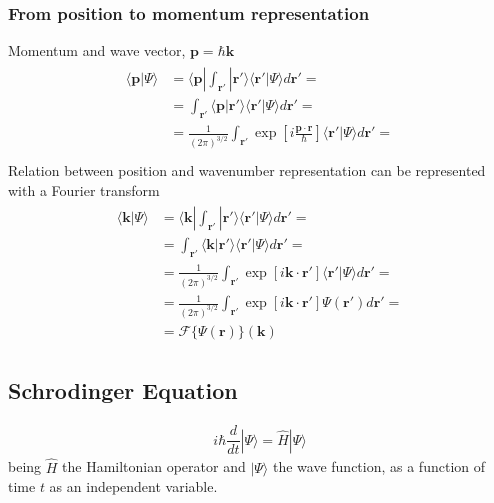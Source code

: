 \documentclass[letterpaper,10pt,english]{jupyterBook}
\begin{document}
\subsubsection{From position to momentum representation}
\label{\detokenize{ch/quantum-mechanics/intro:from-position-to-momentum-representation}}
\sphinxAtStartPar
Momentum and wave vector, \(\mathbf{p} = \hbar \mathbf{k}\)
\begin{equation*}
\begin{split}\begin{aligned}
  \langle \mathbf{p} | \Psi \rangle
  & = \langle \mathbf{p} | \int_{\mathbf{r}'} | \mathbf{r}' \rangle \langle \mathbf{r}' | \Psi\rangle d \mathbf{r}' = \\
  & =   \int_{\mathbf{r}'} \langle \mathbf{p} | \mathbf{r}' \rangle \langle \mathbf{r}' | \Psi\rangle d \mathbf{r}' = \\
  & = \frac{1}{(2\pi)^{3/2}} \int_{\mathbf{r}'} \exp \left[ i \frac{\mathbf{p} \cdot \mathbf{r}}{\hbar} \right] \langle \mathbf{r}' | \Psi\rangle d \mathbf{r}' = \\
\end{aligned}\end{split}
\end{equation*}
\sphinxAtStartPar
Relation between position and wave\sphinxhyphen{}number representation can be represented with a Fourier transform
\begin{equation*}
\begin{split}\begin{aligned}
  \langle \mathbf{k} | \Psi \rangle
  & = \langle \mathbf{k} | \int_{\mathbf{r}'} | \mathbf{r}' \rangle \langle \mathbf{r}' | \Psi\rangle d \mathbf{r}' = \\
  & =   \int_{\mathbf{r}'} \langle \mathbf{k} | \mathbf{r}' \rangle \langle \mathbf{r}' | \Psi\rangle d \mathbf{r}' = \\
  & = \frac{1}{(2\pi)^{3/2}} \int_{\mathbf{r}'} \exp \left[ i \mathbf{k} \cdot \mathbf{r}' \right] \langle \mathbf{r}' | \Psi\rangle d \mathbf{r}' = \\
  & = \frac{1}{(2\pi)^{3/2}} \int_{\mathbf{r}'} \exp \left[ i \mathbf{k} \cdot \mathbf{r}' \right] \Psi(\mathbf{r}') d \mathbf{r}' = \\
  & = \mathscr{F}\{ \Psi(\mathbf{r}) \} (\mathbf{k})
\end{aligned}\end{split}
\end{equation*}

\subsection{Schrodinger Equation}
\label{\detokenize{ch/quantum-mechanics/intro:schrodinger-equation}}\begin{equation*}
\begin{split}i \hbar \dfrac{d}{dt} | \Psi \rangle = \hat{H} | \Psi \rangle \end{split}
\end{equation*}
\sphinxAtStartPar
being \(\hat{H}\) the Hamiltonian operator and \(|\Psi\rangle\) the wave function, as a function of time \(t\) as an independent variable.
\end{document}
